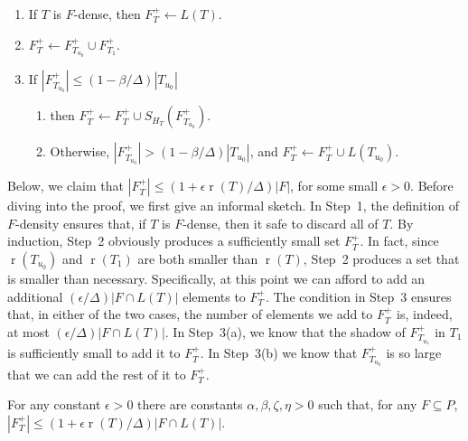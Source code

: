 \documentclass{patmorin}
\DeclareMathOperator{\rank}{r}
\begin{document}
\begin{enumerate}
  \item If $T$ is $F$-dense, then $F^+_T\gets L(T)$. 
  \item $F^+_T\gets F^+_{T_{u_0}}\cup F^+_{T_1}$. 
  \item If $|F^+_{T_{u_0}}|\le (1-\beta/\Delta)|T_{u_0}|$
  \begin{enumerate}
     \item then $F^+_T\gets F^+_T\cup S_{H_T}(F^+_{T_{u_0}})$. 
     \item Otherwise, $|F^+_{T_{u_0}}|> (1-\beta/\Delta)|T_{u_0}|$,
          and $F^+_T\gets F^+_T\cup L(T_{u_0})$.
  \end{enumerate}
\end{enumerate}

Below, we claim that $|F^+_T|\le (1+\epsilon \rank(T)/\Delta)|F|$, for
some small $\epsilon >0$.  Before diving into the proof, we first give an
informal sketch.  In Step~1, the definition of $F$-density ensures that,
if $T$ is $F$-dense, then it safe to discard all of $T$.  By induction,
Step~2 obviously produces a sufficiently small set $F^+_T$.  In fact,
since $\rank(T_{u_0})$ and $\rank(T_1)$ are both smaller than $\rank(T)$,
Step~2 produces a set that is smaller than necessary. Specifically, at this
point we can afford to add an additional $(\epsilon/\Delta)|F\cap L(T)|$
elements to $F^+_T$.  The condition in Step~3 ensures that, in either
of the two cases, the number of elements we add to $F^+_T$ is, indeed,
at most $(\epsilon/\Delta)|F\cap L(T)|$.  In Step~3(a), we know that
the shadow of $F^+_{T_{u_1}}$ in $T_1$ is sufficiently small to add it
to $F^+_T$.  In Step~3(b) we know that $F^+_{T_{u_0}}$ is so large that
we can add the rest of it to $F^+_T$.

\begin{clm}
   For any constant $\epsilon>0$ there are constants
   $\alpha,\beta,\zeta,\eta >0$ such that, for any $F\subseteq P$,
   $|F^+_T| \le (1+\epsilon\rank(T)/\Delta)|F\cap L(T)|$.
\end{clm}
\end{document}
